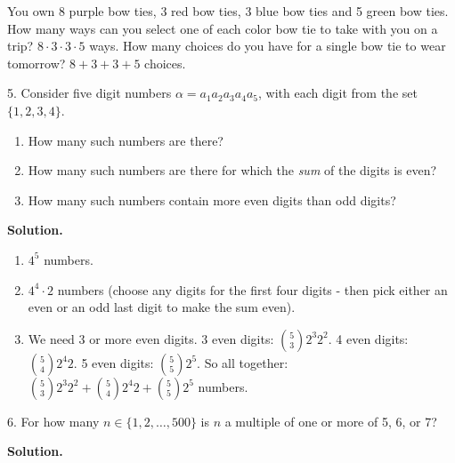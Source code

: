 \documentclass[10pt,]{book}
\theoremstyle{plain}
\theoremstyle{definition}
\theoremstyle{definition}
\theoremstyle{definition}
\numberwithin{equation}{section}
\begin{document}
\begin{exerciselist}
            You own 8 purple bow ties, 3 red bow ties, 3 blue bow ties and 5 green bow ties. How many ways can you select one of each color bow tie to take with you on a trip? \(8 \cdot 3 \cdot 3 \cdot 5\) ways. How many choices do you have for a single bow tie to wear tomorrow? \(8 + 3 + 3 + 5\) choices.
\item[5.]\hypertarget{exercise-106}{}
            Consider five digit numbers \(\alpha = a_1a_2a_3a_4a_5\), with each digit from the set \(\{1,2,3,4\}\).
          \leavevmode%
\begin{enumerate}[label=(\alph*)]
\item\hypertarget{li-727}{}
                How many such numbers are there?
\item\hypertarget{li-728}{}
                How many such numbers are there for which the \emph{sum} of the digits is even?
\item\hypertarget{li-729}{}
                How many such numbers contain more even digits than odd digits?
\end{enumerate}

\par\smallskip
\par\smallskip
\noindent\textbf{Solution.}\hypertarget{solution-157}{}\quad

          \leavevmode%
\begin{enumerate}[label=(\alph*)]
\item\hypertarget{li-730}{}\(4^5\) numbers.%
\item\hypertarget{li-731}{}\(4^4\cdot 2\) numbers (choose any digits for the first four digits - then pick either an even or an odd last digit to make the sum even).%
\item\hypertarget{li-732}{}
                We need 3 or more even digits. 3 even digits: \({5 \choose 3}2^3 2^2\). 4 even digits: \({5 \choose 4}2^4 2\). 5 even digits: \({5 \choose 5}2^5\). So all together: \({5 \choose 3}2^3 2^2 + {5 \choose 4}2^4 2 + {5 \choose 5}2^5\) numbers.
\end{enumerate}

%
\item[6.]\hypertarget{exercise-107}{}
            For how many \(n \in \{1,2, \ldots, 500\}\) is \(n\) a multiple of one or more of 5, 6, or 7?
\par\smallskip
\par\smallskip
\noindent\textbf{Solution.}\hypertarget{solution-158}{}\quad


\end{exerciselist}
\end{document}
